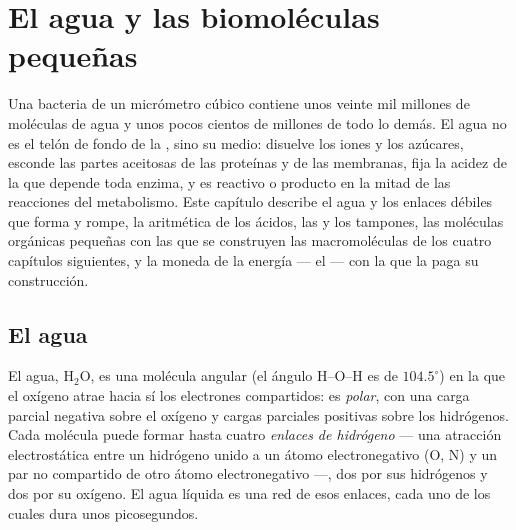\chapter{El agua y las biomoléculas pequeñas}\label{ch:b1:water-small-molecules}

Una bacteria de un micrómetro cúbico contiene unos veinte mil millones de
moléculas de agua y unos pocos cientos de millones de todo lo demás. El agua
no es el telón de fondo de la , sino su medio: disuelve los iones y
los azúcares, esconde las partes aceitosas de las proteínas y de las
membranas, fija la acidez de la que depende toda enzima, y es reactivo o
producto en la mitad de las reacciones del metabolismo. Este capítulo
describe el agua y los enlaces débiles que forma y rompe, la aritmética de
los ácidos, las  y los tampones, las moléculas orgánicas pequeñas con
las que se construyen las macromoléculas de los cuatro capítulos siguientes,
y la moneda de la energía --- el  --- con la que la  paga su
construcción.

\section{El agua}

\begin{definition}\label{def:b1:water-small-molecules:water}
El agua, $\mathrm{H_2O}$, es una molécula angular (el ángulo H--O--H es de
$104.5^\circ$) en la que el oxígeno atrae hacia sí los electrones
compartidos: es \emph{polar}, con una carga parcial
negativa sobre el oxígeno y cargas parciales positivas sobre los hidrógenos.
Cada molécula puede formar hasta cuatro \emph{enlaces de
hidrógeno} --- una atracción electrostática entre
un hidrógeno unido a un átomo electronegativo (O, N) y un par no compartido
de otro átomo electronegativo ---, dos por sus hidrógenos y dos por su
oxígeno. El agua líquida es una red de esos enlaces, cada uno de los cuales
dura unos picosegundos.
\end{definition}

